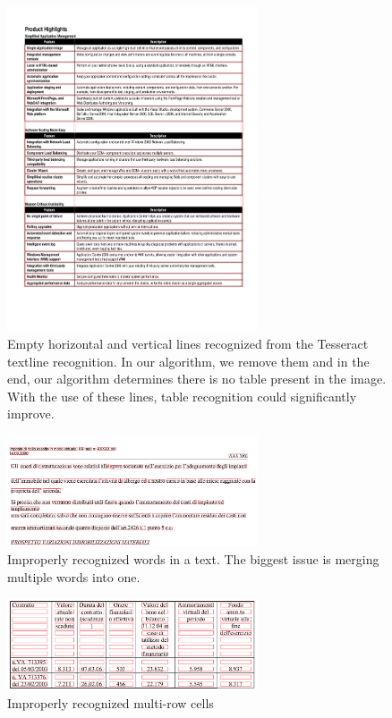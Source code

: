 \begin{figure}[t]
\centering
\includegraphics[width=20em]{img/results/errorTableBordered.png}
\caption{Empty horizontal and vertical lines recognized from the Tesseract textline recognition. In our algorithm, we remove them and in the end, our algorithm determines there is no table present in the image. With the use of these lines, table recognition could significantly improve.}
\label{fig:errorTableBordered}
\end{figure}

\begin{figure}[t]
\centering
\includegraphics[width=20em]{img/results/errorWordWhitespace.png}
\caption{Improperly recognized words in a text. The biggest issue is merging multiple words into one.}
\label{fig:errorWordWs}
\end{figure}

\begin{figure}[t]
\centering
\includegraphics[width=20em]{img/results/errorMultiRow.png}
\caption{Improperly recognized multi-row cells}
\label{fig:errorMultiRow}
\end{figure}

